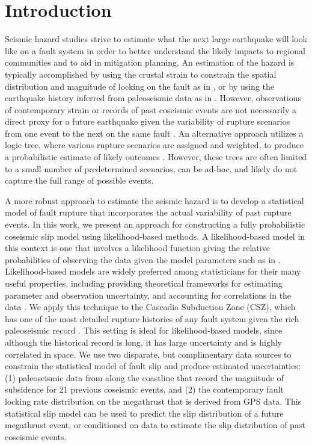 {\section{Introduction}
\label{intro}
Seismic hazard studies strive to estimate what the next large earthquake will look like on a fault system in order to better understand the likely impacts to regional communities and to aid in mitigation planning.  An estimation of the hazard is typically accomplished by using the crustal strain to constrain the spatial distribution and magnitude of locking on the fault as in \citet{mccaffrey2013}, or by using the earthquake history inferred from paleoseismic data as in \citet{wang2013}.  However, observations of contemporary strain or records of past coseismic events are not necessarily a direct proxy for a future earthquake given the variability of rupture scenarios from one event to the next on the same fault \citet{stein2012}.  An alternative approach utilizes a logic tree, where various rupture scenarios are assigned and weighted, to produce a probabilistic estimate of likely outcomes \citep{witter2013}.  However, these trees are often limited to a small number of predetermined scenarios, can be ad-hoc, and likely do not capture the full range of possible events.

A more robust approach to estimate the seismic hazard is to develop a statistical model of fault rupture that incorporates the actual variability of past rupture events.  In this work, we present an approach for constructing a fully probabilistic coseismic slip model using likelihood-based methods.  A likelihood-based model in this context is one that involves a likelihood function giving the relative probabilities of observing the data given the model parameters such as in \citep{minson2013, duputel2015}.  Likelihood-based models are widely preferred among statisticians for their many useful properties, including providing theoretical frameworks for estimating parameter and observation uncertainty, and accounting for correlations in the data \citep[Ch. 6-10]{CasellaBerger}.  We apply this technique to the Cascadia Subduction Zone (CSZ), which has one of the most detailed rupture histories of any fault system given the rich paleoseismic record \citep{leonard2010}.  This setting is ideal for likelihood-based models, since although the historical record is long, it has large uncertainty and is highly correlated in space.  We use two disparate, but complimentary data sources to constrain the statistical model of fault slip and produce estimated uncertainties: (1) paleoseismic data from along the coastline that record the magnitude of subsidence for 21 previous coseismic events, and (2) the contemporary fault locking rate distribution on the megathrust that is derived from GPS data.  This statistical slip model can be used to predict the slip distribution of a future megathrust event, or conditioned on data to estimate the slip distribution of past coseismic events. 

}
